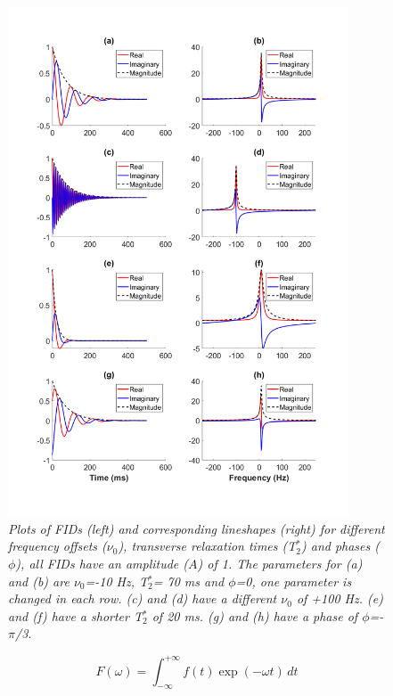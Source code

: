 \begin{figure}
    \centering
    \includegraphics[width=0.9\textwidth]{Figures/Theory/FID_Lorentz.png}
    \caption{\textit{Plots of \ac{FID}s (left) and corresponding lineshapes (right) for different frequency offsets ($\nu_0$), transverse relaxation times (T$_2^*$) and phases ($\phi$), all FIDs have an amplitude ($A$) of 1. The parameters for (a) and (b) are $\nu_0$=-10 Hz, T$_2^*$= 70 ms and $\phi$=0, one parameter is changed in each row. (c) and (d) have a different $\nu_0$ of +100 Hz. (e) and (f) have a shorter T$_2^*$ of 20 ms. (g) and (h) have a phase of $\phi$=-$\pi$/3.}}
    \label{fig:theory:FID_Lorentz}
\end{figure}

\begin{equation}
    F(\omega) = \int_{-\infty}^{+\infty} f(t)\exp(-\omega t) \, dt
    \label{eqn:theory:fourier}
\end{equation}

